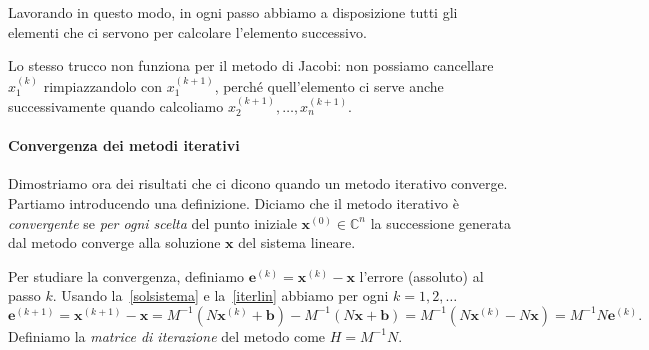 \documentclass[a4paper]{report}
\theoremstyle{definition}
\theoremstyle{remark}
\newcommand{\x}{\mathbf{x}}
\newcommand{\e}{\mathbf{e}}
\renewcommand{\b}{\mathbf{b}}
\begin{document}
Lavorando in questo modo, in ogni passo abbiamo a disposizione tutti gli elementi che ci servono per calcolare l'elemento successivo.

Lo stesso trucco non funziona per il metodo di Jacobi: non possiamo cancellare $x_1^{(k)}$ rimpiazzandolo con $x_1^{(k+1)}$, perché quell'elemento ci serve anche successivamente quando calcoliamo $x_2^{(k+1)}, \dots, x_n^{(k+1)}$.

\paragraph{Convergenza dei metodi iterativi} Dimostriamo ora dei risultati che ci dicono quando un metodo iterativo converge. Partiamo introducendo una definizione. Diciamo che il metodo iterativo è \emph{convergente} se \emph{per ogni scelta} del punto iniziale $\x^{(0)}\in\mathbb{C}^n$ la successione generata dal metodo converge alla soluzione $\x$ del sistema lineare.

Per studiare la convergenza, definiamo $\e^{(k)} = \x^{(k)} - \x$ l'errore (assoluto) al passo $k$. Usando la~\eqref{solsistema} e la~\eqref{iterlin} abbiamo per ogni $k=1,2,\dots$
\begin{equation} \label{ekiter}
    \e^{(k+1)} = \x^{(k+1)} - \x = M^{-1}(N\x^{(k)} + \b) - M^{-1}(N\x + \b) = M^{-1}(N\x^{(k)}-N \x) = M^{-1}N \e^{(k)}.    
\end{equation}
Definiamo la \emph{matrice di iterazione} del metodo come $H = M^{-1}N$.
\end{document}
